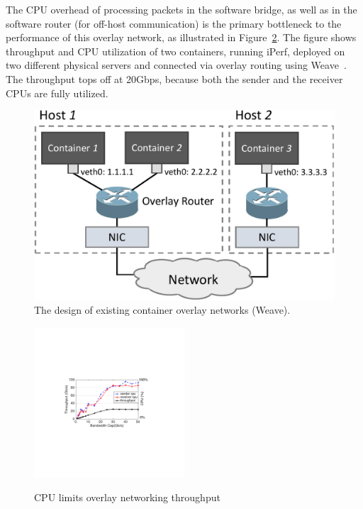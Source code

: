 The CPU overhead of processing packets in the software bridge, as well as in the
software router (for off-host communication) is the primary bottleneck to the
performance of this overlay network, as illustrated in
Figure~\ref{fig:mot_bw_cpu}. The figure shows throughput and CPU utilization of
two containers, running iPerf, deployed on two different physical servers and
connected via overlay routing using Weave~\cite{weave}. The throughput tops off
at 20Gbps, because both the sender and the receiver CPUs are fully utilized.

\begin{figure} [t]
	\centering   
	\includegraphics[width=0.8\linewidth]{figures/overlay-2.pdf}   
	\caption{\label{fig:overlay} The design of existing container overlay networks (Weave).}   
\end{figure}   

\begin{figure}[t]
\centering 
\includegraphics[width=0.5\textwidth]{figures/motivation/mot_bw_cpu.pdf}      
\label{fig:mot_bw_cpu}
\caption{CPU limits overlay networking throughput}
\end{figure}
